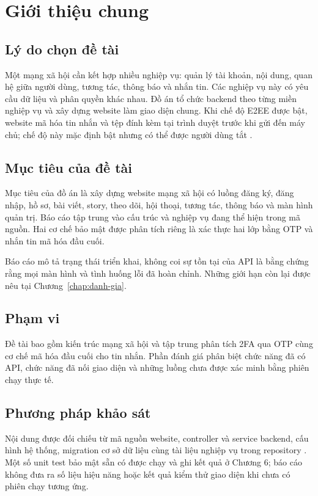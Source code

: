 \chapter{Giới thiệu chung}
\section{Lý do chọn đề tài}
Một mạng xã hội cần kết hợp nhiều nghiệp vụ: quản lý tài khoản, nội dung, quan hệ giữa người dùng, tương tác, thông báo và nhắn tin. Các nghiệp vụ này có yêu cầu dữ liệu và phân quyền khác nhau. Đồ án \project{} tổ chức backend theo từng miền nghiệp vụ và xây dựng website làm giao diện chung. Khi chế độ E2EE được bật, website mã hóa tin nhắn và tệp đính kèm tại trình duyệt trước khi gửi đến máy chủ; chế độ này mặc định bật nhưng có thể được người dùng tắt \cite{architecture,e2ee}.

\section{Mục tiêu của đề tài}
Mục tiêu của đồ án là xây dựng website mạng xã hội có luồng đăng ký, đăng nhập, hồ sơ, bài viết, story, theo dõi, hội thoại, tương tác, thông báo và màn hình quản trị. Báo cáo tập trung vào cấu trúc và nghiệp vụ đang thể hiện trong mã nguồn. Hai cơ chế bảo mật được phân tích riêng là xác thực hai lớp bằng OTP và nhắn tin mã hóa đầu cuối.

Báo cáo mô tả trạng thái triển khai, không coi sự tồn tại của API là bằng chứng rằng mọi màn hình và tình huống lỗi đã hoàn chỉnh. Những giới hạn còn lại được nêu tại Chương~\ref{chap:danh-gia}.

\section{Phạm vi}
Đề tài bao gồm kiến trúc mạng xã hội và tập trung phân tích 2FA qua OTP cùng cơ chế mã hóa đầu cuối cho tin nhắn. Phần đánh giá phân biệt chức năng đã có API, chức năng đã nối giao diện và những luồng chưa được xác minh bằng phiên chạy thực tế.

\section{Phương pháp khảo sát}
Nội dung được đối chiếu từ mã nguồn website, controller và service backend, cấu hình hệ thống, migration cơ sở dữ liệu cùng tài liệu nghiệp vụ trong repository \cite{readme,architecture,usecases,twofa,e2ee}. Một số unit test bảo mật sẵn có được chạy và ghi kết quả ở Chương 6; báo cáo không đưa ra số liệu hiệu năng hoặc kết quả kiểm thử giao diện khi chưa có phiên chạy tương ứng.
